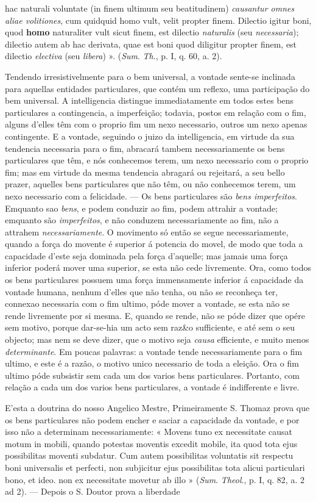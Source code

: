 hac naturali voluntate (in finem ultimum seu beatitudinem) \emph{causantur omnes aliae volitiones}, cum quidquid homo vult, velit propter finem. Dilectio igitur boni, quod \textbf{homo} naturaliter vult sicut finem, est dilectio \emph{naturalis} (seu \emph{necessaria}); dilectio autem ab hac derivata, quae est boni quod diligitur propter finem, est dilectio \emph{electiva} (seu \emph{libera}) ». (\emph{Sum}. \emph{Th}., p. I, q. 60, a. 2).\par Tendendo irresistivelmente para o bem universal, a vontade sente-se inclinada para aquellas entidades particulares, que contém um reflexo, uma participação do bem universal. A intelligencia distingue immediatamente em todos estes bens particulares a contingencia, a imperfeição; todavia, postos em relação com o fim, alguns d'elles têm com o proprio fim um nexo necessario, outros um nexo apenas contingente. E a vontade, seguindo o juizo da intelligencia, em virtude da sua tendencia necessaria para o fim, abracará tambem necessariamente os bens particulares que têm, e nós conhecemos terem, um nexo necessario com o proprio fim; mas em virtude da mesma tendencia abragará ou rejeitará, a seu bello prazer, aquelles bens particulares que não têm, ou não conhecemos terem, um nexo necessario com a felicidade. --- Os bens particulares são \emph{bens imperfeitos}. Emquanto sao \emph{bens}, e podem conduzir ao fim, podem attrahir a vontade; emquanto são \emph{imperfeitos}, e não conduzem necessariamente ao fim, não a attrahem \emph{necessariamente}. O movimento só então se segue necessariamente, quando a força do movente é superior á potencia do movel, de modo que toda a capacidade d'este seja dominada pela força d'aquelle; mas jamais uma força inferior poderá mover uma superior, se esta não cede livremente. Ora, como todos os bens particulares possuem uma força immensamente inferior á capacidade da vontade humana, nenhum d'elles que não tenha, ou não se reconheça ter, connexao necessaria com o fim ultimo, póde mover a vontade, se esta não se rende livremente por si mesma. E, quando se rende, não se póde dizer que opére sem motivo, porque dar-se-hia um acto sem raz\&o sufficiente, e até sem o seu objecto; mas nem se deve dizer, que o motivo seja \emph{causa} efficiente, e muito menos \emph{determinante}. Em poucas palavras: a vontade tende necessariamente para o fim ultimo, e este é a razão, o motivo unico necessario de toda a eleição. Ora o fim ultimo póde subsistir sem cada um dos varios bens particulares. Portanto, com relação a cada um dos varios bens particulares, a vontade é indifferente e livre.\par E'esta a doutrina do nosso Angelico Mestre, Primeiramente S. Thomaz prova que os bens particulares não podem encher e saciar a capacidade da vontade, e por isso não a determinam necessariamente: « Movens tuno ex necessitate causat motum in mobili, quando potestas moventis excedit mobile, ita quod tota ejus possibilitas moventi subdatur. Cum autem possibilitas voluntatis sit respectu boni universalis et perfecti, non subjicitur ejus possibilitas tota alicui particulari bono, et ideo. non ex necessitate movetur ab illo » (\emph{Sum}. \emph{Theol}., p. I, q. 82, a. 2 ad 2). --- Depois o S. Doutor prova a liberdade 
